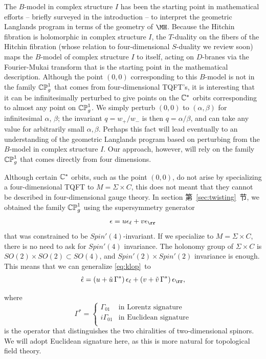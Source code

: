 The $B$-model in complex structure $I$ has been the starting point
in mathematical efforts -- briefly surveyed in the introduction --
to interpret the geometric Langlands program in terms of the
geometry of $\MH$.  Because the Hitchin fibration is holomorphic
in complex structure $I$, the $T$-duality on the fibers of the
Hitchin fibration (whose relation to four-dimensional $S$-duality
we review soon) maps the $B$-model of complex structure $I$ to
itself, acting  on $D$-branes via the Fourier-Mukai transform that
is the starting point in the mathematical description.  Although
the point $(0,0)$ corresponding to this $B$-model is not in the
family $\Bbb{CP}_g^1$ that comes from four-dimensional TQFT's, it
is interesting that it can be infinitesimally perturbed to give
points on the $\Bbb{C}^*$ orbits corresponding to almost any point
on $\Bbb{CP}^1_g$.  We simply perturb $(0,0)$ to $(\alpha,\beta)$
for infinitesimal $\alpha$, $\beta$; the invariant $q=w_+/w_-$ is
then $q=\alpha/\beta$, and can take any value for arbitrarily
small $\alpha,\beta$.  Perhaps this fact will lead eventually to
an understanding of the geometric Langlands program based on
perturbing from the $B$-model in complex structure $I$.  Our
approach, however, will rely on the family $\Bbb{CP}^1_g$ that
comes directly from four dimensions.

Although certain $\Bbb{C}^*$ orbits, such as the point $(0,0)$, do
not arise by specializing a four-dimensional TQFT to
$M=\Sigma\times C$, this does not meant that they cannot be
described in four-dimensional gauge theory.  In section 第~\ref{sec:twisting}~节,
we obtained the family $\Bbb{CP}^1_g$ using the supersymmetry
generator %
\setcounter{equation}{12}
\begin{equation}\label{eq:klop}
\epsilon=u\epsilon_\ell+v\epsilon_\rr
\end{equation}
 that
was constrained to be $Spin'(4)$-invariant.  If we specialize to
$M=\Sigma\times C$, there is no need to ask for $Spin'(4)$
invariance.  The holonomy group of $\Sigma\times C$ is
$SO(2)\times SO(2)\subset SO(4)$, and $Spin'(2)\times Spin'(2)$
invariance is enough.  This means that we can generalize \eqref{eq:klop}\ to
\setcounter{equation}{13}
\begin{equation}\label{eq:blop}
\hat\epsilon=\left(u+\tilde u\,
\Gamma^*\right)\epsilon_\ell
                 +\left(v+\tilde v\,\Gamma^*\right)\epsilon_\rr,
\end{equation}

                 where
\setcounter{equation}{14}
\begin{equation}\label{eq:ujbyty}
\Gamma^*=\begin{cases}\Gamma_{01}&\text{in Lorentz
signature}\\ i\Gamma_{01}&\text{in Euclidean signature}\\\end{cases}
\end{equation}
 is
the operator that distinguishes the two chiralities of
two-dimensional spinors.  We will adopt Euclidean signature here,
as this is more natural for topological field theory.

